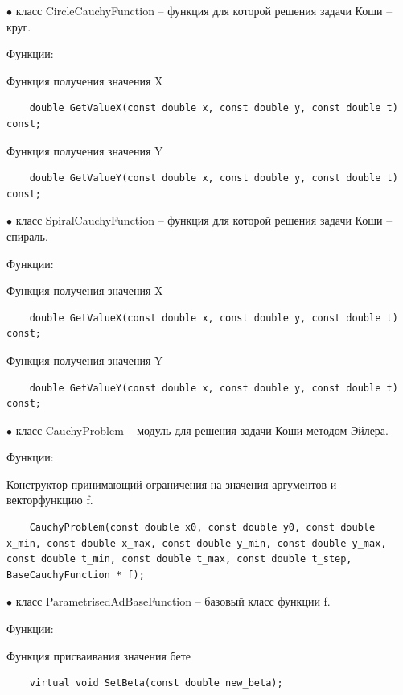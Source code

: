 \documentclass{article}
\theoremstyle{definition}
\theoremstyle{remark}
\begin{document}
$\bullet$ класс CircleCauchyFunction -- функция для которой решения задачи Коши -- круг.

Функции:

Функция получения значения X
\begin{lstlisting}
	double GetValueX(const double x, const double y, const double t) const;
\end{lstlisting}


Функция получения значения Y

\begin{lstlisting}
	double GetValueY(const double x, const double y, const double t) const;
\end{lstlisting}

$\bullet$ класс SpiralCauchyFunction -- функция для которой решения задачи Коши -- спираль.

Функции:

Функция получения значения X
\begin{lstlisting}
	double GetValueX(const double x, const double y, const double t) const;
\end{lstlisting}


Функция получения значения Y

\begin{lstlisting}
	double GetValueY(const double x, const double y, const double t) const;
\end{lstlisting}


$\bullet$ класс CauchyProblem -- модуль для решения задачи Коши методом Эйлера.

Функции:

Конструктор принимающий ограничения на значения аргументов и векторфункцию f.

\begin{lstlisting}
	CauchyProblem(const double x0, const double y0, const double x_min, const double x_max, const double y_min, const double y_max, const double t_min, const double t_max, const double t_step, BaseCauchyFunction * f);
\end{lstlisting}

$\bullet$ класс ParametrisedAdBaseFunction -- базовый класс функции f.

Функции:

Функция присваивания значения бете

\begin{lstlisting}
	virtual void SetBeta(const double new_beta);

\end{lstlisting}
\end{document}

